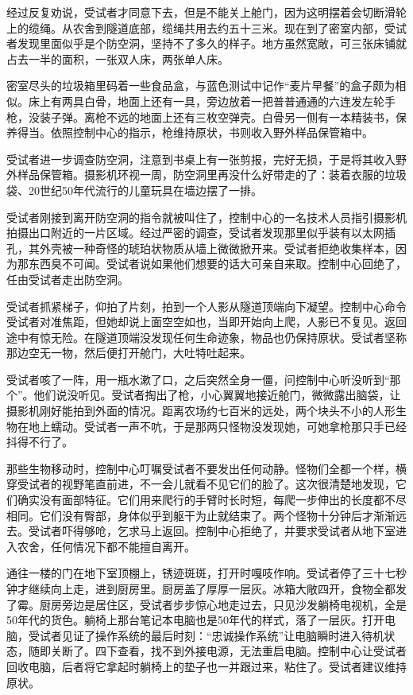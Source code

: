 \begin{scpbox}
经过反复劝说，受试者才同意下去，但是不能关上舱门，因为这明摆着会切断滑轮上的缆绳。从农舍到隧道底部，缆绳共用去约五十三米。现在到了密室内部，受试者发现里面似乎是个防空洞，坚持不了多久的样子。地方虽然宽敞，可三张床铺就占去一半的面积，一张双人床，两张单人床。

密室尽头的垃圾箱里码着一些食品盒，与蓝色测试中记作“麦片早餐”的盒子颇为相似。床上有两具白骨，地面上还有一具，旁边放着一把普普通通的六连发左轮手枪，没装子弹。离枪不远的地面上还有三枚空弹壳。白骨另一侧有一本精装书，保养得当。依照控制中心的指示，枪维持原状，书则收入野外样品保管箱中。

受试者进一步调查防空洞，注意到书桌上有一张剪报，完好无损，于是将其收入野外样品保管箱。摄影机环视一周，防空洞里再没什么好带走的了：装着衣服的垃圾袋、20世纪50年代流行的儿童玩具在墙边摆了一排。

受试者刚接到离开防空洞的指令就被叫住了，控制中心的一名技术人员指引摄影机拍摄出口附近的一片区域。经过严密的调查，受试者发现那里似乎装有以太网插孔，其外壳被一种奇怪的琥珀状物质从墙上微微掀开来。受试者拒绝收集样本，因为那东西臭不可闻。受试者说如果他们想要的话大可亲自来取。控制中心回绝了，任由受试者走出防空洞。

受试者抓紧梯子，仰拍了片刻，拍到一个人影从隧道顶端向下凝望。控制中心命令受试者对准焦距，但她却说上面空空如也，当即开始向上爬，人影已不复见。返回途中有惊无险。在隧道顶端没发现任何生命迹象，物品也仍保持原状。受试者坚称那边空无一物，然后便打开舱门，大吐特吐起来。

受试者咳了一阵，用一瓶水漱了口，之后突然全身一僵，问控制中心听没听到“那个”。他们说没听见。受试者掏出了枪，小心翼翼地接近舱门，微微露出脑袋，让摄影机刚好能拍到外面的情况。距离农场约七百米的远处，两个块头不小的人形生物在地上蠕动。受试者一声不吭，于是那两只怪物没发现她，可她拿枪那只手已经抖得不行了。

那些生物移动时，控制中心叮嘱受试者不要发出任何动静。怪物们全都一个样，横穿受试者的视野笔直前进，不一会儿就看不见它们的脸了。这次很清楚地发现，它们确实没有面部特征。它们用来爬行的手臂时长时短，每爬一步伸出的长度都不尽相同。它们没有臀部，身体似乎到躯干为止就结束了。两个怪物十分钟后才渐渐远去。受试者吓得够呛，乞求马上返回。控制中心拒绝了，并要求受试者从地下室进入农舍，任何情况下都不能擅自离开。

通往一楼的门在地下室顶棚上，锈迹斑斑，打开时嘎吱作响。受试者停了三十七秒钟才继续向上走，进到厨房里。厨房盖了厚厚一层灰。冰箱大敞四开，食物全都发了霉。厨房旁边是居住区，受试者步步惊心地走过去，只见沙发躺椅电视机，全是50年代的货色。躺椅上那台笔记本电脑也是50年代的样式，落了一层灰。打开电脑，受试者见证了操作系统的最后时刻：“忠诚操作系统”让电脑瞬时进入待机状态，随即关断了。四下查看，找不到外接电源，无法重启电脑。控制中心让受试者回收电脑，后者将它拿起时躺椅上的垫子也一并跟过来，粘住了。受试者建议维持原状。


\end{scpbox}
